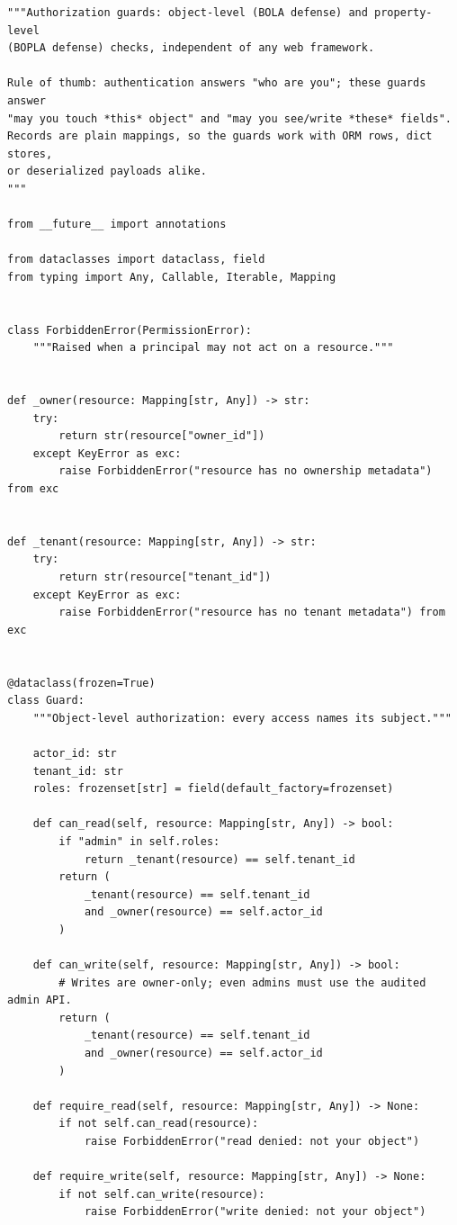 \begin{verbatim}
"""Authorization guards: object-level (BOLA defense) and property-level
(BOPLA defense) checks, independent of any web framework.

Rule of thumb: authentication answers "who are you"; these guards answer
"may you touch *this* object" and "may you see/write *these* fields".
Records are plain mappings, so the guards work with ORM rows, dict stores,
or deserialized payloads alike.
"""

from __future__ import annotations

from dataclasses import dataclass, field
from typing import Any, Callable, Iterable, Mapping


class ForbiddenError(PermissionError):
    """Raised when a principal may not act on a resource."""


def _owner(resource: Mapping[str, Any]) -> str:
    try:
        return str(resource["owner_id"])
    except KeyError as exc:
        raise ForbiddenError("resource has no ownership metadata") from exc


def _tenant(resource: Mapping[str, Any]) -> str:
    try:
        return str(resource["tenant_id"])
    except KeyError as exc:
        raise ForbiddenError("resource has no tenant metadata") from exc


@dataclass(frozen=True)
class Guard:
    """Object-level authorization: every access names its subject."""

    actor_id: str
    tenant_id: str
    roles: frozenset[str] = field(default_factory=frozenset)

    def can_read(self, resource: Mapping[str, Any]) -> bool:
        if "admin" in self.roles:
            return _tenant(resource) == self.tenant_id
        return (
            _tenant(resource) == self.tenant_id
            and _owner(resource) == self.actor_id
        )

    def can_write(self, resource: Mapping[str, Any]) -> bool:
        # Writes are owner-only; even admins must use the audited admin API.
        return (
            _tenant(resource) == self.tenant_id
            and _owner(resource) == self.actor_id
        )

    def require_read(self, resource: Mapping[str, Any]) -> None:
        if not self.can_read(resource):
            raise ForbiddenError("read denied: not your object")

    def require_write(self, resource: Mapping[str, Any]) -> None:
        if not self.can_write(resource):
            raise ForbiddenError("write denied: not your object")



\end{verbatim}
